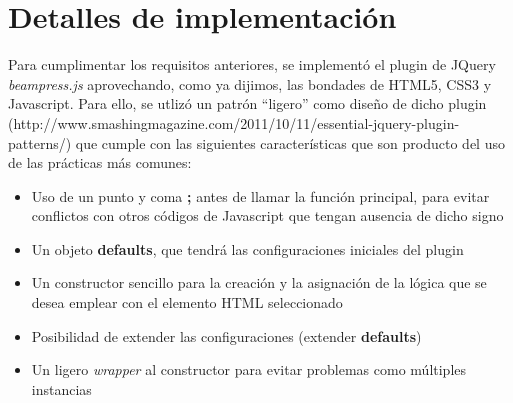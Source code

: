 \chapter{Detalles de implementación} %
\label{cha:detalles_de_implementacion}
	Para cumplimentar los requisitos anteriores, se implementó el plugin de JQuery \textit{beampress.js} aprovechando, como ya dijimos, las bondades de HTML5, CSS3 y Javascript. Para ello, se utlizó un patrón ``ligero'' como diseño de dicho plugin (http://www.smashingmagazine.com/2011/10/11/essential-jquery-plugin-patterns/) que cumple con las siguientes características que son producto del uso de las prácticas más comunes:

	\begin{itemize}
		\item Uso de un punto y coma \textbf{;} antes de llamar la función principal, para evitar conflictos con otros códigos de Javascript que tengan ausencia de dicho signo
		\item Un objeto \textbf{defaults}, que tendrá las configuraciones iniciales del plugin
		\item Un constructor sencillo para la creación y la asignación de la lógica que se desea emplear con el elemento HTML seleccionado
		\item Posibilidad de extender las configuraciones (extender \textbf{defaults})
		\item Un ligero \textit{wrapper} al constructor para evitar problemas como múltiples instancias
	\end{itemize}
